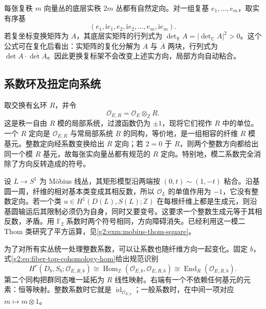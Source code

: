 \begin{example}\label{g2:exm:complex-bundle-real-orientation}
	每张复秩 \(m\) 向量丛的底层实秩 \(2m\) 丛都有自然定向。对一组复基 \(e_1,\ldots,e_m\)，取实有序基
	\[
		(e_1,\mathrm i e_1,e_2,\mathrm i e_2,\ldots,e_m,\mathrm i e_m).
	\]
	若复坐标变换矩阵为 \(A\)，其底层实矩阵的行列式为 \(\det_{\mathbb R}A=|\det_{\mathbb C}A|^2>0\)。这个公式可在复化后看出：实矩阵的复化分解为 \(A\) 与 \(\overline A\) 两块，行列式为 \(\det A\cdot\overline{\det A}\)。因此更换复标架不会改变上述实方向，局部方向自动粘合。
\end{example}

\subsection{系数环及扭定向系统}
\label{g2:subsec:2001:03}
取交换有幺环 \(R\)，并令
\[
	\mathcal O_{E,R}=\mathcal O_E\otimes_{\mathbb Z}R.
\]
这是秩一自由 \(R\) 模的局部系统，过渡函数仍为 \(\pm1\)，现将它们视作 \(R\) 中的单位。一个 \(R\) 定向是 \(\mathcal O_{E,R}\) 与常局部系统 \(\underline R\) 的同构，等价地，是一组相容的纤维 \(R\) 模基元。整数定向经系数变换给出 \(R\) 定向；若 \(2=0\) 于 \(R\)，则两个整数方向都给出同一个模 \(R\) 基元，故每张实向量丛都有规范的 \(R\) 定向。特别地，模二系数完全消除了方向反转造成的符号。

\begin{example}\label{g2:exm:mobius-orientation-system}
	设 \(L\to S^1\) 为 Möbius 线丛，其矩形模型沿两端按 \((0,t)\sim(1,-t)\) 粘合。沿基圆一周，纤维的相对基本类变成其相反数，所以 \(\mathcal O_L\) 的单值作用为 \(-1\)，它没有整数定向。若一个类 \(u\in H^1(D(L),S(L);\mathbb Z)\) 在每根纤维上都是生成元，则沿基圆输运后其限制必须仍为自身，同时又要变号。这要求一个整数生成元等于其相反数，矛盾。用 \(\mathbb F_2\) 系数时两个符号相同，方向障碍消失。已经利用这一模二 Thom 类研究了平方运算，见\cref{g2:exm:mobius-thom-square}。
\end{example}

为了对所有实丛统一处理整数系数，可以让系数也随纤维方向一起变化。固定 \(b\)，式\eqref{g2:eq:fiber-top-cohomology-hom}给出规范识别
\begin{equation}\label{g2:eq:twisted-fiber-endomorphism}
	H^r(D_b,S_b;\mathcal O_{E,R,b})
	\cong\operatorname{Hom}_{\mathbb Z}(\mathcal O_{E,b},\mathcal O_{E,R,b})
	\cong\operatorname{End}_R(\mathcal O_{E,R,b}).
\end{equation}
第二个同构把群同态唯一延拓为 \(R\) 线性映射。右端有一个不依赖任何基元的元素：恒等映射。整数系数时它就是 \(\operatorname{id}_{\mathcal O_{E,b}}\)；一般系数时，在中间一项对应 \(m\mapsto m\otimes1\)。

